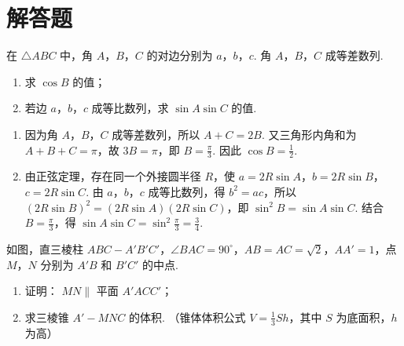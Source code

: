 \section{解答题}

\begin{problem}
在 \(\triangle ABC\) 中，角 \(A\)，\(B\)，\(C\) 的对边分别为 \(a\)，\(b\)，\(c\). 角 \(A\)，\(B\)，\(C\) 成等差数列.
\begin{enumerate}
\item 求 \(\cos B\) 的值；
\item 若边 \(a\)，\(b\)，\(c\) 成等比数列，求 \(\sin A \sin C\) 的值.
\end{enumerate}
\end{problem}

\begin{solution}
\begin{enumerate}
\item 因为角 \(A\)，\(B\)，\(C\) 成等差数列，所以 \(A+C=2B\). 又三角形内角和为 \(A+B+C=\pi\)，故 \(3B=\pi\)，即 \(B=\frac{\pi}{3}\). 因此 \(\cos B=\frac{1}{2}\).
\item 由正弦定理，存在同一个外接圆半径 \(R\)，使 \(a=2R\sin A\)，\(b=2R\sin B\)，\(c=2R\sin C\). 由 \(a\)，\(b\)，\(c\) 成等比数列，得 \(b^2=ac\)，所以
\(\left(2R\sin B\right)^2=\left(2R\sin A\right)\left(2R\sin C\right)\)，即 \(\sin^2B=\sin A\sin C\). 结合 \(B=\frac{\pi}{3}\)，得 \(\sin A\sin C=\sin^2\frac{\pi}{3}=\frac{3}{4}\).
\end{enumerate}
\end{solution}

\begin{problem}
如图，直三棱柱 \(ABC - A'B'C'\)，\(\angle BAC = 90^\circ\)，\(AB = AC = \sqrt{2}\)，\(AA' = 1\)，点 \(M\)，\(N\) 分别为 \(A'B\) 和 \(B'C'\) 的中点.
\begin{enumerate}
\item 证明： \(MN \parallel\) 平面 \(A'ACC'\)；
\item 求三棱锥 \( A' - MNC \) 的体积. （锥体体积公式 \( V = \frac{1}{3} Sh \)，其中 \(S\) 为底面积，\(h\) 为高）
\end{enumerate}

\end{problem}


